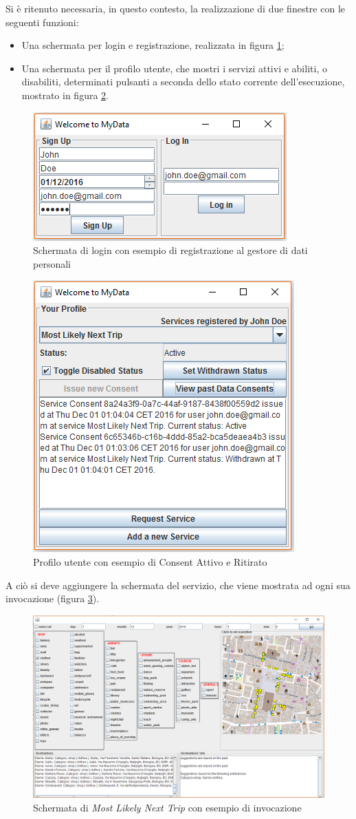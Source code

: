 Si \`e ritenuto necessaria, in questo contesto, la realizzazione di due finestre con le seguenti funzioni:
\begin{itemize}
	\item Una schermata per login e registrazione, realizzata in figura \ref{fig:welcomePanel};
	\item Una schermata per il profilo utente, che mostri i servizi attivi e abiliti, o disabiliti, determinati pulsanti a seconda dello stato corrente dell’esecuzione, mostrato in figura \ref{fig:exampleConsentInProj}.
\end{itemize}
\begin{figure} 
	\centering
	\includegraphics[width=0.5\linewidth]{pictures/welcomePanel.png}
	\caption{Schermata di login con esempio di registrazione al gestore di dati personali}
	\label{fig:welcomePanel}
\end{figure}
\begin{figure}
	\centering
	\includegraphics[width=0.5\linewidth]{pictures/exampleConsentInProj.png}
	\caption{Profilo utente con esempio di Consent Attivo e Ritirato}
	\label{fig:exampleConsentInProj}
\end{figure}
A ci\`o si deve aggiungere la schermata del servizio, che viene mostrata ad ogni sua invocazione (figura \ref{fig:MLNTPanel}).
\begin{figure}
	\centering
	\includegraphics[width=0.85\linewidth]{pictures/MLNTPanel.png}
	\caption{Schermata di\textit{ Most Likely Next Trip} con esempio di invocazione}
	\label{fig:MLNTPanel}
\end{figure}

